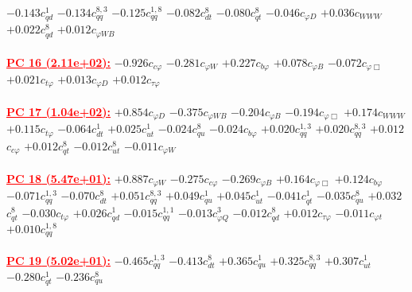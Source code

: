 \documentclass{article}
\begin{document}
{$-0.143$}{\rm $c_{qd}^{1}$} 
{$-0.134$}{\rm $c_{qq}^{8,3}$} 
{$-0.125$}{\rm $c_{qq}^{1,8}$} 
{$-0.082$}{\rm $c_{dt}^{8}$} 
{$-0.080$}{\rm $c_{qt}^{8}$} 
{$-0.046$}{\rm $c_{\varphi D}$} 
{$+0.036$}{\rm $c_{WWW}$} 
{$+0.022$}{\rm $c_{qd}^{8}$} 
{$+0.012$}{\rm $c_{\varphi WB}$} 
 \nonumber \\ \nonumber \\ 
\noindent \textcolor{red}{\underline{\bf{PC 16} (2.11e+02):}}
{$-0.926$}{\rm $c_{c \varphi}$} 
{$-0.281$}{\rm $c_{\varphi W}$} 
{$+0.227$}{\rm $c_{b \varphi}$} 
{$+0.078$}{\rm $c_{\varphi B}$} 
{$-0.072$}{\rm $c_{\varphi \Box}$} 
{$+0.021$}{\rm $c_{t \varphi}$} 
{$+0.013$}{\rm $c_{\varphi D}$} 
{$+0.012$}{\rm $c_{\tau \varphi}$} 
 \nonumber \\ \nonumber \\ 
\noindent \textcolor{red}{\underline{\bf{PC 17} (1.04e+02):}}
{$+0.854$}{\rm $c_{\varphi D}$} 
{$-0.375$}{\rm $c_{\varphi WB}$} 
{$-0.204$}{\rm $c_{\varphi B}$} 
{$-0.194$}{\rm $c_{\varphi \Box}$} 
{$+0.174$}{\rm $c_{WWW}$} 
{$+0.115$}{\rm $c_{t \varphi}$} 
{$-0.064$}{\rm $c_{dt}^{1}$} 
{$+0.025$}{\rm $c_{ut}^{1}$} 
{$-0.024$}{\rm $c_{qu}^{8}$} 
{$-0.024$}{\rm $c_{b \varphi}$} 
{$+0.020$}{\rm $c_{qq}^{1,3}$} 
{$+0.020$}{\rm $c_{qq}^{8,3}$} 
{$+0.012$}{\rm $c_{c \varphi}$} 
{$+0.012$}{\rm $c_{qt}^{8}$} 
{$-0.012$}{\rm $c_{ut}^{8}$} 
{$-0.011$}{\rm $c_{\varphi W}$} 
 \nonumber \\ \nonumber \\ 
\noindent \textcolor{red}{\underline{\bf{PC 18} (5.47e+01):}}
{$+0.887$}{\rm $c_{\varphi W}$} 
{$-0.275$}{\rm $c_{c \varphi}$} 
{$-0.269$}{\rm $c_{\varphi B}$} 
{$+0.164$}{\rm $c_{\varphi \Box}$} 
{$+0.124$}{\rm $c_{b \varphi}$} 
{$-0.071$}{\rm $c_{qq}^{1,3}$} 
{$-0.070$}{\rm $c_{dt}^{8}$} 
{$+0.051$}{\rm $c_{qq}^{8,3}$} 
{$+0.049$}{\rm $c_{qu}^{1}$} 
{$+0.045$}{\rm $c_{ut}^{1}$} 
{$-0.041$}{\rm $c_{qt}^{1}$} 
{$-0.035$}{\rm $c_{qu}^{8}$} 
{$+0.032$}{\rm $c_{qt}^{8}$} 
{$-0.030$}{\rm $c_{t \varphi}$} 
{$+0.026$}{\rm $c_{qd}^{1}$} 
{$-0.015$}{\rm $c_{qq}^{1,1}$} 
{$-0.013$}{\rm $c_{\varphi Q}^{3}$} 
{$-0.012$}{\rm $c_{qd}^{8}$} 
{$+0.012$}{\rm $c_{\tau \varphi}$} 
{$-0.011$}{\rm $c_{\varphi t}$} 
{$+0.010$}{\rm $c_{qq}^{1,8}$} 
 \nonumber \\ \nonumber \\ 
\noindent \textcolor{red}{\underline{\bf{PC 19} (5.02e+01):}}
{$-0.465$}{\rm $c_{qq}^{1,3}$} 
{$-0.413$}{\rm $c_{dt}^{8}$} 
{$+0.365$}{\rm $c_{qu}^{1}$} 
{$+0.325$}{\rm $c_{qq}^{8,3}$} 
{$+0.307$}{\rm $c_{ut}^{1}$} 
{$-0.280$}{\rm $c_{qt}^{1}$} 
{$-0.236$}{\rm $c_{qu}^{8}$} 
\end{document}
